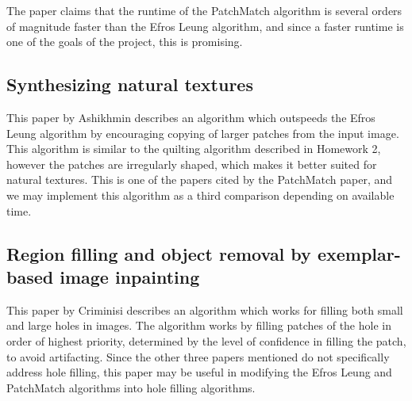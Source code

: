 The paper claims that the runtime of the PatchMatch algorithm is several orders of magnitude faster than the Efros Leung algorithm, and since a faster runtime is one of the goals of the project, this is promising.
\subsection*{Synthesizing natural textures \cite{ashikhmin2001synthesizing}}
This paper by Ashikhmin describes an algorithm which outspeeds the Efros Leung algorithm by encouraging copying of larger patches from the input image. This algorithm is similar to the quilting algorithm described in Homework 2, however the patches are irregularly shaped, which makes it better suited for natural textures. This is one of the papers cited by the PatchMatch paper, and we may implement this algorithm as a third comparison depending on available time.
\subsection*{Region filling and object removal by exemplar-based image inpainting \cite{criminisi2004region}}
This paper by Criminisi \etal describes an algorithm which works for filling both small and large holes in images. The algorithm works by filling patches of the hole in order of highest priority, determined by the level of confidence in filling the patch, to avoid artifacting. Since the other three papers mentioned do not specifically address hole filling, this paper may be useful in modifying the Efros Leung and PatchMatch algorithms into hole filling algorithms.
